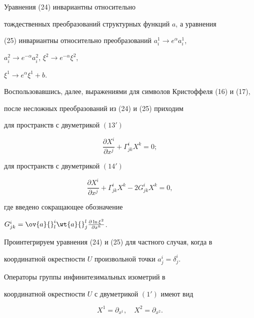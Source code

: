 \begin{cornonum}


Уравнения (24) инвариантны относительно


тождественных преобразований структурных функций $a$, а уравнения


(25) инвариантны относительно преобразований $a^1_i\to e^{\alpha}a^1_i$,


$a^2_i\to e^{-\alpha}a^2_i$, $\xi^2\to e^{-\alpha}\xi^2$,


$\xi^1\to e^{\alpha}\xi^1+b$.


\end{cornonum}





Воспользовавшись, далее, выражениями для символов Кристоффеля (16) и (17),


после несложных преобразований из (24) и (25) приходим





для пространств с двуметрикой $(13')$


$$


\frac{\partial X^i}{\partial x^j}+\Gamma^i_{jk}X^k=0;


$$





для пространств с двуметрикой $(14')$


$$


\frac{\partial X^i}{\partial x^j}+\Gamma^i_{jk}X^k - 2G^i_{jk}X^k= 0,


$$


где введено сокращающее обозначение


$G^i_{jk}=\ov{a}{}^i_l\wt{a}{}^l_j\frac{\partial \ln\xi^2}{\partial


x^k}$.





Проинтегрируем уравнения (24) и (25) для частного случая, когда в


координатной окрестности $U$ произвольной точки $a^i_j=\delta^i_j$.





\begin{thm}


Операторы группы инфинитезимальных изометрий в


координатной окрестности $U$ с двуметрикой $(1')$ имеют вид


\begin{equation}


X^1=\partial_{x^1},\quad


X^2=\partial_{x^2}.


\end{equation}


\end{thm}





